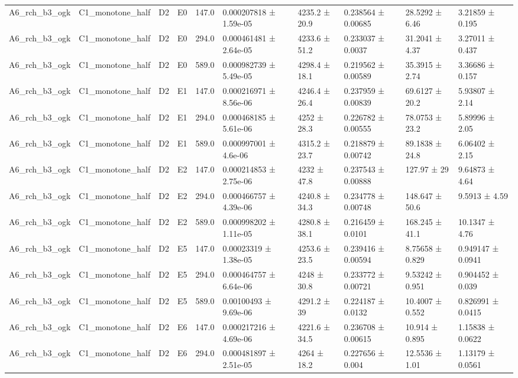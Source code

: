 \begin{table}
\begin{tabular}{llllllllll}
A6\_rch\_b3\_ogk & C1\_monotone\_half & D2 & E0 & 147.0 & 0.000207818 ± 1.59e-05 & 4235.2 ± 20.9 & 0.238564 ± 0.00685 & 28.5292 ± 6.46 & 3.21859 ± 0.195 \\
A6\_rch\_b3\_ogk & C1\_monotone\_half & D2 & E0 & 294.0 & 0.000461481 ± 2.64e-05 & 4233.6 ± 51.2 & 0.233037 ± 0.0037 & 31.2041 ± 4.37 & 3.27011 ± 0.437 \\
A6\_rch\_b3\_ogk & C1\_monotone\_half & D2 & E0 & 589.0 & 0.000982739 ± 5.49e-05 & 4298.4 ± 18.1 & 0.219562 ± 0.00589 & 35.3915 ± 2.74 & 3.36686 ± 0.157 \\
A6\_rch\_b3\_ogk & C1\_monotone\_half & D2 & E1 & 147.0 & 0.000216971 ± 8.56e-06 & 4246.4 ± 26.4 & 0.237959 ± 0.00839 & 69.6127 ± 20.2 & 5.93807 ± 2.14 \\
A6\_rch\_b3\_ogk & C1\_monotone\_half & D2 & E1 & 294.0 & 0.000468185 ± 5.61e-06 & 4252 ± 28.3 & 0.226782 ± 0.00555 & 78.0753 ± 23.2 & 5.89996 ± 2.05 \\
A6\_rch\_b3\_ogk & C1\_monotone\_half & D2 & E1 & 589.0 & 0.000997001 ± 4.6e-06 & 4315.2 ± 23.7 & 0.218879 ± 0.00742 & 89.1838 ± 24.8 & 6.06402 ± 2.15 \\
A6\_rch\_b3\_ogk & C1\_monotone\_half & D2 & E2 & 147.0 & 0.000214853 ± 2.75e-06 & 4232 ± 47.8 & 0.237543 ± 0.00888 & 127.97 ± 29 & 9.64873 ± 4.64 \\
A6\_rch\_b3\_ogk & C1\_monotone\_half & D2 & E2 & 294.0 & 0.000466757 ± 4.39e-06 & 4240.8 ± 34.3 & 0.234778 ± 0.00748 & 148.647 ± 50.6 & 9.5913 ± 4.59 \\
A6\_rch\_b3\_ogk & C1\_monotone\_half & D2 & E2 & 589.0 & 0.000998202 ± 1.11e-05 & 4280.8 ± 38.1 & 0.216459 ± 0.0101 & 168.245 ± 41.1 & 10.1347 ± 4.76 \\
A6\_rch\_b3\_ogk & C1\_monotone\_half & D2 & E5 & 147.0 & 0.00023319 ± 1.38e-05 & 4253.6 ± 23.5 & 0.239416 ± 0.00594 & 8.75658 ± 0.829 & 0.949147 ± 0.0941 \\
A6\_rch\_b3\_ogk & C1\_monotone\_half & D2 & E5 & 294.0 & 0.000464757 ± 6.64e-06 & 4248 ± 30.8 & 0.233772 ± 0.00721 & 9.53242 ± 0.951 & 0.904452 ± 0.039 \\
A6\_rch\_b3\_ogk & C1\_monotone\_half & D2 & E5 & 589.0 & 0.00100493 ± 9.69e-06 & 4291.2 ± 39 & 0.224187 ± 0.0132 & 10.4007 ± 0.552 & 0.826991 ± 0.0415 \\
A6\_rch\_b3\_ogk & C1\_monotone\_half & D2 & E6 & 147.0 & 0.000217216 ± 4.69e-06 & 4221.6 ± 34.5 & 0.236708 ± 0.00615 & 10.914 ± 0.895 & 1.15838 ± 0.0622 \\
A6\_rch\_b3\_ogk & C1\_monotone\_half & D2 & E6 & 294.0 & 0.000481897 ± 2.51e-05 & 4264 ± 18.2 & 0.227656 ± 0.004 & 12.5536 ± 1.01 & 1.13179 ± 0.0561 \\

\end{tabular}
\end{table}
